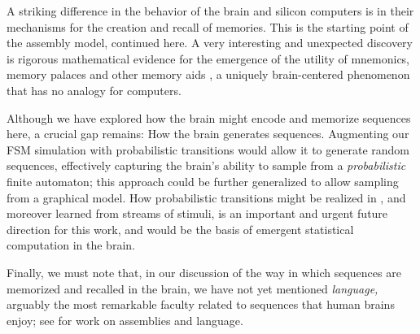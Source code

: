 \documentclass[12pt,nosubfloats]{alt2024} %
\newcommand{\1}{\mathbbm{1}}
\begin{document}
A striking difference in the behavior of the brain and silicon computers is in their mechanisms for the creation and recall of memories. This is the starting point of the assembly model, continued here. A very interesting and unexpected discovery is rigorous mathematical evidence for the emergence of the utility of mnemonics, memory palaces and other memory aids \citep{maguire2003routes}, a uniquely brain-centered phenomenon that has no analogy for computers.  

Although we have explored how the brain might encode and memorize sequences here, a crucial gap remains: How the brain generates sequences. Augmenting our FSM simulation with probabilistic transitions would allow it to generate random sequences, effectively capturing the brain's ability to sample from a {\em probabilistic} finite automaton; this approach could be further generalized to allow sampling from a graphical model. How probabilistic transitions might be realized in \name, and moreover learned from streams of stimuli, is an important and urgent future direction for this work, and would be the basis of emergent statistical computation in the brain.

Finally, we must note that, in our discussion of the way in which sequences are memorized and recalled in the brain, we have not yet mentioned {\em language,} arguably the most remarkable faculty related to sequences that human brains enjoy; see \citet{mitropolsky2021biologically, mitropolsky2022center} for work on assemblies and language.





\end{document}
